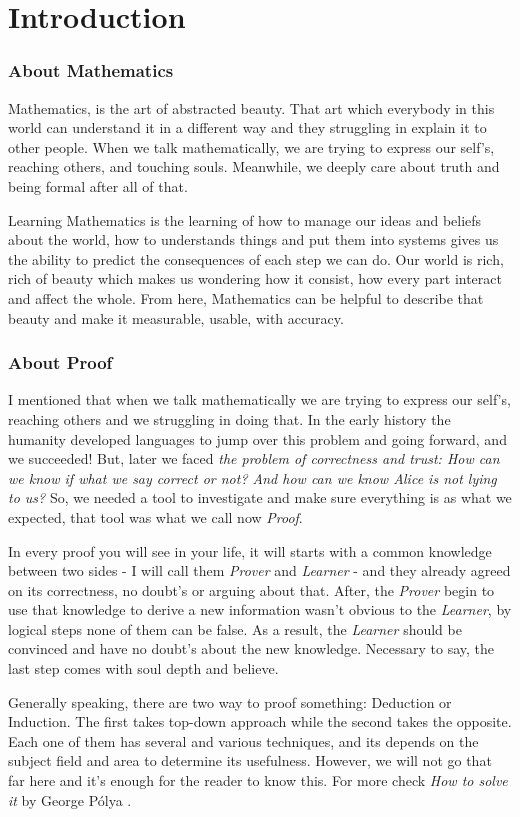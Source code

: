 \part{Introduction}
\section{About Mathematics}
Mathematics, is the art of abstracted beauty. That art which everybody in this world can understand it in a different way and they struggling in explain it to other people. When we talk mathematically, we are trying to express our self's, reaching others, and touching souls. Meanwhile, we deeply care about truth and being formal after all of that.

Learning Mathematics is the learning of how to manage our ideas and beliefs about the world, how to understands things and put them into systems gives us the ability to predict the consequences of each step we can do. Our world is rich, rich of beauty which makes us wondering how it consist, how every part interact and affect the whole. From here, Mathematics can be helpful to describe that beauty and make it measurable, usable, with accuracy.

\section{About Proof}
I mentioned that when we talk mathematically we are trying to express our self's, reaching others and we struggling in doing that. In the early history the humanity developed languages to jump over this problem and going forward, and we succeeded! But, later we faced {\it the problem of correctness and trust: How can we know if what we say correct or not? And how can we know Alice is not lying to us?} So, we needed a tool to investigate and make sure everything is as what we expected, that tool was what we call now {\it Proof}.

In every proof you will see in your life, it will starts with a common knowledge between two sides - I will call them {\it Prover} and {\it Learner} - and they already agreed on its correctness, no doubt's or arguing about that. After, the {\it Prover} begin to use that knowledge to derive a new information wasn't obvious to the {\it Learner}, by logical steps none of them can be false. As a result, the {\it Learner} should be convinced and have no doubt's about the new knowledge. Necessary to say, the last step comes with soul depth and believe.

Generally speaking, there are two way to proof something: Deduction or Induction. The first takes top-down approach while the second takes the opposite. Each one of them has several and various techniques, and its depends on the subject field and area to determine its usefulness. However, we will not go that far here and it's enough for the reader to know this. For more check {\it How to solve it} by George Pólya \cite{polyasolve}.

